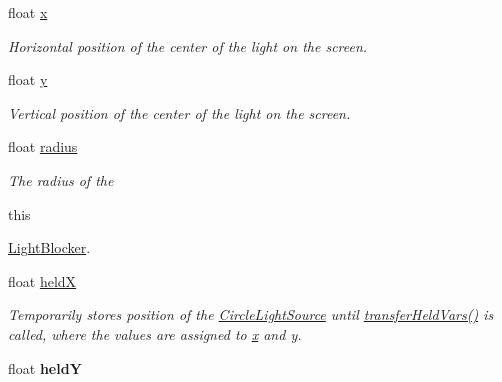 \begin{DoxyCompactItemize}
float \hyperlink{classlighting_1_1CircleLightSource_afd27de5d967e2a308dadeff29d3c2883}{x}
\begin{DoxyCompactList}\small\item\em Horizontal position of the center of the light on the screen. \end{DoxyCompactList}\item 
float \hyperlink{classlighting_1_1CircleLightSource_ac05186b92c9bdfcef8a27cc89f8c9b52}{y}
\begin{DoxyCompactList}\small\item\em Vertical position of the center of the light on the screen. \end{DoxyCompactList}\item 
float \hyperlink{classlighting_1_1CircleLightSource_a4da9b32f524563c2faeba5ea81dfe6fb}{radius}
\begin{DoxyCompactList}\small\item\em The radius of the 
\begin{DoxyCode}
\textcolor{keyword}{this}
\end{DoxyCode}
 \hyperlink{classlighting_1_1LightBlocker}{Light\+Blocker}. \end{DoxyCompactList}\item 
float \hyperlink{classlighting_1_1CircleLightSource_aa008d846fd893f0ff40e5994af4d487e}{heldX}
\begin{DoxyCompactList}\small\item\em Temporarily stores position of the \hyperlink{classlighting_1_1CircleLightSource}{Circle\+Light\+Source} until \hyperlink{classlighting_1_1CircleLightSource_afc39570a33c19b17fb8153be592b01e9}{transfer\+Held\+Vars()} is called, where the values are assigned to \hyperlink{classlighting_1_1CircleLightSource_afd27de5d967e2a308dadeff29d3c2883}{x} and \hyperlink{classlighting_1_1CircleLightSource_ac05186b92c9bdfcef8a27cc89f8c9b52}{y}. \end{DoxyCompactList}\item 
float {\bfseries heldY}\hypertarget{classlighting_1_1CircleLightSource_a9aff8b920ad87fa895b1dd7c379bc99b}{}\label{classlighting_1_1CircleLightSource_a9aff8b920ad87fa895b1dd7c379bc99b}

\end{DoxyCompactItemize}
